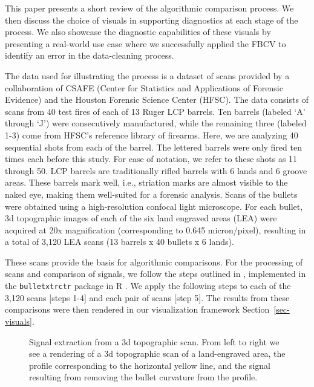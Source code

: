 \documentclass[
  number,
  preprint,
  5p,
  twocolumn]{elsarticle}
\begin{document}
This paper presents a short review of the algorithmic comparison
process. We then discuss the choice of visuals in supporting diagnostics
at each stage of the process. We also showcase the diagnostic
capabilities of these visuals by presenting a real-world use case where
we successfully applied the FBCV to identify an error in the
data-cleaning process.

The data used for illustrating the process is a dataset of scans
provided by a collaboration of CSAFE (Center for Statistics and
Applications of Forensic Evidence) and the Houston Forensic Science
Center (HFSC). The data consists of scans from 40 test fires of each of
13 Ruger LCP barrels. Ten barrels (labeled `A' through `J') were
consecutively manufactured, while the remaining three (labeled 1-3) come
from HFSC's reference library of firearms. Here, we are analyzing 40
sequential shots from each of the barrel. The lettered barrels were only
fired ten times each before this study. For ease of notation, we refer
to these shots as 11 through 50. LCP barrels are traditionally rifled
barrels with 6 lands and 6 groove areas. These barrels mark well, i.e.,
striation marks are almost visible to the naked eye, making them
well-suited for a forensic analysis. Scans of the bullets were obtained
using a high-resolution confocal light microscope. For each bullet, 3d
topographic images of each of the six land engraved areas (LEA) were
acquired at 20x magnification (corresponding to 0.645 micron/pixel),
resulting in a total of 3,120 LEA scans (13 barrels x 40 bullets x 6
lands).

These scans provide the basis for algorithmic comparisons. For the
processing of scans and comparison of signals, we follow the steps
outlined in \citep{hareAutomaticMatchingBullet2017}, implemented in the
\texttt{bulletxtrctr} package in R
\citep{hofmannBulletxtrctrAutomaticMatching2022}. We apply the following
steps to each of the 3,120 scans {[}steps 1-4{]} and each pair of scans
{[}step 5{]}. The results from these comparisons were then rendered in
our visualization framework Section~\ref{sec-visuals}.

\begin{figure}


\caption{\label{fig-extracted-sigs}Signal extraction from a 3d
topographic scan. From left to right we see a rendering of a 3d
topographic scan of a land-engraved area, the profile corresponding to
the horizontal yellow line, and the signal resulting from removing the
bullet curvature from the profile.}

\end{figure}%
\end{document}
